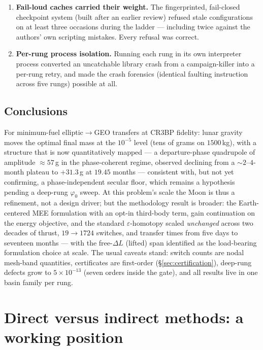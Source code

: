 \documentclass[11pt]{article}
\begin{document}
\begin{enumerate}
  signal. Two rungs of this ladder landed in basins $9$--$14$\,kg better
  than the two-body campaign's certified table rows. Every $\Delta m_f$
  reported here is therefore differenced against a $g=0$ control run
  through the identical seed, mesh, and continuation path.
\item \textbf{Fail-loud caches carried their weight.} The fingerprinted,
  fail-closed checkpoint system (built after an earlier review) refused
  stale configurations on at least three occasions during the ladder ---
  including twice against the authors' own scripting mistakes. Every
  refusal was correct.
\item \textbf{Per-rung process isolation.} Running each rung in its own
  interpreter process converted an uncatchable library crash from a
  campaign-killer into a per-rung retry, and made the crash forensics
  (identical faulting instruction across five rungs) possible at all.
\end{enumerate}

\subsection{Conclusions}

For minimum-fuel elliptic$\to$GEO transfers at CR3BP fidelity: lunar
gravity moves the optimal final mass at the $10^{-5}$ level (tens of
grams on $1500$\,kg), with a structure that is now quantitatively mapped
--- a departure-phase quadrupole of amplitude $\approx 57$\,g in the
phase-coherent regime, observed declining from a $\sim 2$--$4$-month
plateau to $+31.3$\,g at $19.45$ months --- consistent with, but not yet
confirming, a phase-independent secular floor, which remains a hypothesis
pending a deep-rung $\varphi_0$ sweep. At this problem's
scale the Moon is thus a refinement, not a design driver; but the
methodology result is broader: the Earth-centered MEE formulation with an
opt-in third-body term, gain continuation on the energy objective, and the
standard $\varepsilon$-homotopy scaled \emph{unchanged} across two decades
of thrust, $19 \to 1724$ switches, and transfer times from five days to
seventeen months --- with the free-$\Delta L$ (lifted) span identified as
the load-bearing formulation choice at scale. The usual caveats stand:
switch counts are nodal mesh-band quantities, certificates are first-order
(\S\ref{sec:certification}), deep-rung defects grow to $5\times10^{-13}$ (seven orders inside
the gate), and all results live in one basin family per rung.

\section{Direct versus indirect methods: a working position}
\end{document}
